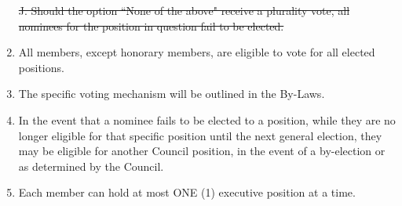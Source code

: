\documentclass[]{report}
\begin{document}
\begin{enumerate}
		\st{J. Should the option ``None of the above" receive a plurality vote, all nominees for the position in question fail to be elected.}\color{red}
		\item All members, except honorary members, are eligible to vote for all elected positions.
		\item The specific voting mechanism will be outlined in the By-Laws.\color{black}
		\item In the event that a nominee fails to be elected to a position, while they are no longer eligible for that specific position until the next general election, they may be eligible for another Council position, in the event of a by-election or as determined by the Council.
		\item Each member can hold at most ONE (1) executive position at a time.
	
	\end{enumerate}
\end{document}
